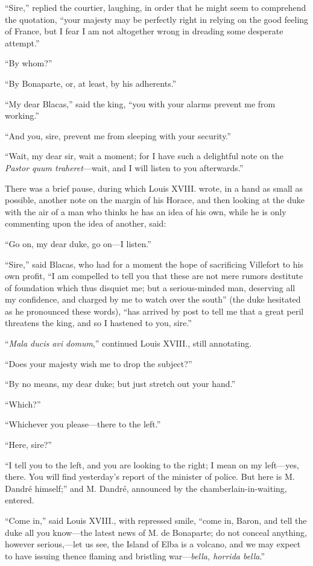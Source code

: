 “Sire,” replied the courtier, laughing, in order that he might seem to
comprehend the quotation, “your majesty may be perfectly right in
relying on the good feeling of France, but I fear I am not altogether
wrong in dreading some desperate attempt.”

“By whom?”

“By Bonaparte, or, at least, by his adherents.”

“My dear Blacas,” said the king, “you with your alarms prevent me from
working.”

“And you, sire, prevent me from sleeping with your security.”

“Wait, my dear sir, wait a moment; for I have such a delightful note on
the \textit{Pastor quum traheret}—wait, and I will listen to you afterwards.”

There was a brief pause, during which Louis XVIII. wrote, in a hand as
small as possible, another note on the margin of his Horace, and then
looking at the duke with the air of a man who thinks he has an idea of
his own, while he is only commenting upon the idea of another, said:

“Go on, my dear duke, go on—I listen.”

“Sire,” said Blacas, who had for a moment the hope of sacrificing
Villefort to his own profit, “I am compelled to tell you that these are
not mere rumors destitute of foundation which thus disquiet me; but a
serious-minded man, deserving all my confidence, and charged by me to
watch over the south” (the duke hesitated as he pronounced these
words), “has arrived by post to tell me that a great peril threatens
the king, and so I hastened to you, sire.”

“\textit{Mala ducis avi domum},” continued Louis XVIII., still annotating.

“Does your majesty wish me to drop the subject?”

“By no means, my dear duke; but just stretch out your hand.”

“Which?”

“Whichever you please—there to the left.”

“Here, sire?”

“I tell you to the left, and you are looking to the right; I mean on my
left—yes, there. You will find yesterday’s report of the minister of
police. But here is M. Dandré himself;” and M. Dandré, announced by the
chamberlain-in-waiting, entered.

“Come in,” said Louis XVIII., with repressed smile, “come in, Baron,
and tell the duke all you know—the latest news of M. de Bonaparte; do
not conceal anything, however serious,—let us see, the Island of Elba
is a volcano, and we may expect to have issuing thence flaming and
bristling war—\textit{bella, horrida bella}.”

